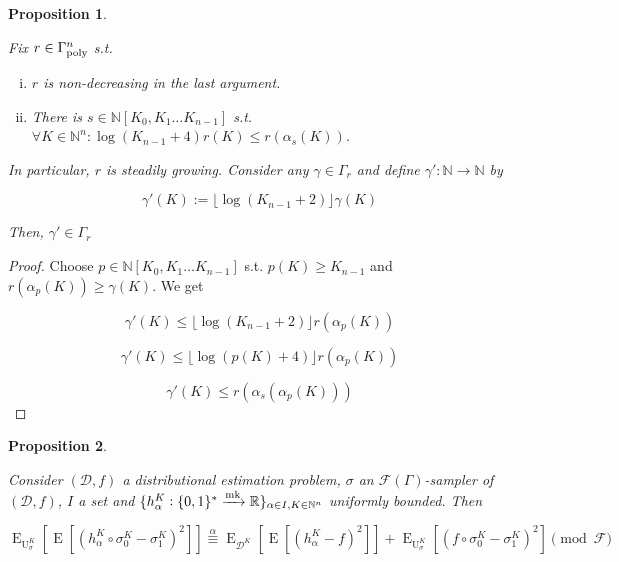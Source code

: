 \documentclass{article}
\numberwithin{equation}{section}
\theoremstyle{definition}
\theoremstyle{plain}
\newtheorem{proposition}{Proposition}[section]
\newcommand{\Bool}{\{0,1\}}
\newcommand{\Words}{{\Bool^*}}
\DeclareMathOperator{\E}{E}
\DeclareMathOperator{\Un}{U}
\newcommand{\Nats}{\mathbb{N}}
\newcommand{\Reals}{\mathbb{R}}
\newcommand{\NatPoly}{\Nats[K_0, K_1 \ldots K_{n-1}]}
\newcommand{\Floor}[1]{\lfloor #1 \rfloor}
\newcommand{\Dist}{\mathcal{D}}
\newcommand{\Fall}{\mathcal{F}}
\newcommand{\EG}{\Fall(\Gamma)}
\newcommand{\GammaPoly}{\Gamma_{\textnormal{poly}}}
\newcommand{\Markov}{\xrightarrow{\textnormal{mk}}}
\begin{document}
\begin{samepage}
\begin{proposition}
\label{prp:std_grow_log}

Fix ${r \in \GammaPoly^n}$ s.t.

\begin{enumerate}[(i)]

\item ${r}$ is non-decreasing in the last argument.

\item There is ${s \in \NatPoly}$ s.t. ${\forall K \in \Nats^n: \log(K_{n-1}+4)r(K) \leq r(\alpha_s(K))}$.

\end{enumerate}

In particular, ${r}$ is steadily growing. Consider any ${\gamma \in \Gamma_r}$ and define ${\gamma': \Nats \rightarrow \Nats}$ by 

\[\gamma'(K):=\Floor{\log(K_{n-1}+2)}\gamma(K)\]

Then, ${\gamma' \in \Gamma_r}$

\end{proposition}
\end{samepage}

\begin{proof}

Choose ${p \in \NatPoly}$ s.t. ${p(K) \geq K_{n-1}}$ and ${r(\alpha_p(K)) \geq \gamma(K)}$. We get 

\[\gamma'(K) \leq \Floor{\log(K_{n-1}+2)} r(\alpha_p(K))\]

\[\gamma'(K) \leq \Floor{\log(p(K)+4)} r(\alpha_p(K))\]

\[\gamma'(K) \leq r(\alpha_s(\alpha_p(K)))\]
%
\end{proof}

\begin{samepage}
\begin{proposition}
\label{prp:est_err_smp}

Consider ${(\Dist,f)}$ a distributional estimation problem, ${\sigma}$ an ${\EG}$-sampler of ${(\Dist,f)}$, ${I}$ a set and ${\{h_\alpha^K: \Words \Markov \Reals\}_{\alpha \in I, K \in \Nats^n}}$ uniformly bounded. Then

\begin{equation}
\label{eqn:prp__est_err_smp}
\E_{\Un_\sigma^K}[\E[(h_\alpha^K \circ \sigma^K_0-\sigma^K_1)^2]] \overset{\alpha}{\equiv} \E_{\Dist^K}[\E[(h_\alpha^K-f)^2]] + \E_{\Un_\sigma^K}[(f \circ \sigma^K_0-\sigma^K_1)^2] \pmod \Fall
\end{equation}

\end{proposition}
\end{samepage}
\end{document}
